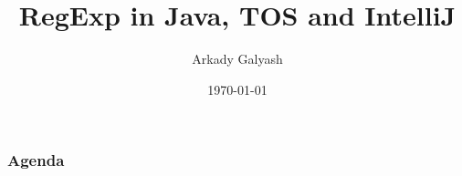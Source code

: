 \documentclass[14pt]{beamer}
\begin{document}
\title{RegExp in Java, TOS and IntelliJ}
\author{Arkady Galyash}
\date{\today}

\newcommand{\smaller}[1] {
  {\scriptsize {#1}}
}

\frame{\titlepage}


\frame%
{\frametitle{Agenda}
  \tableofcontents[1]
}

\end{document}
